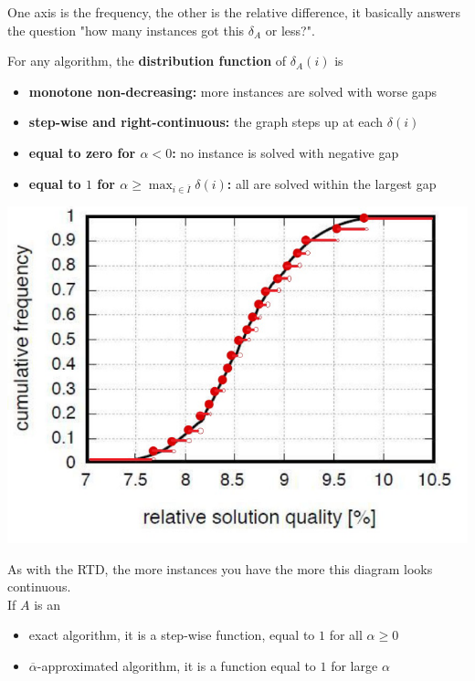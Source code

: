 \documentclass[11pt]{article}
\begin{document}
	One axis is the frequency, the other is the relative difference, it basically answers the question "how many instances got this $\delta_A$ or less?". \\
	
	\newpage
	
	For any algorithm, the \textbf{distribution function} of $\delta_A (i)$ is
	\begin{itemize}
		\item \textbf{monotone non-decreasing:} more instances are solved with worse gaps
		\item \textbf{step-wise and right-continuous:} the graph steps up at each $\delta (i)$
		\item \textbf{equal to zero for $\alpha < 0$:} no instance is solved with negative gap
		\item \textbf{equal to $1$ for $\alpha \geq \max_{i \in \overline{I}} \delta (i)$:} all are solved within the largest gap
	\end{itemize}
	\begin{center}
		\includegraphics[width=0.7\columnwidth]{img/SQD2}
	\end{center}
	As with the RTD, the more instances you have the more this diagram looks continuous.\\
	
	If $A$ is an
	\begin{itemize}
		\item exact algorithm, it is a step-wise function, equal to $1$ for all $\alpha \geq 0$
		\item $\overline{\alpha}$-approximated algorithm, it is a function equal to $1$ for large $\alpha$
	\end{itemize}
	\nn
	
\end{document}
